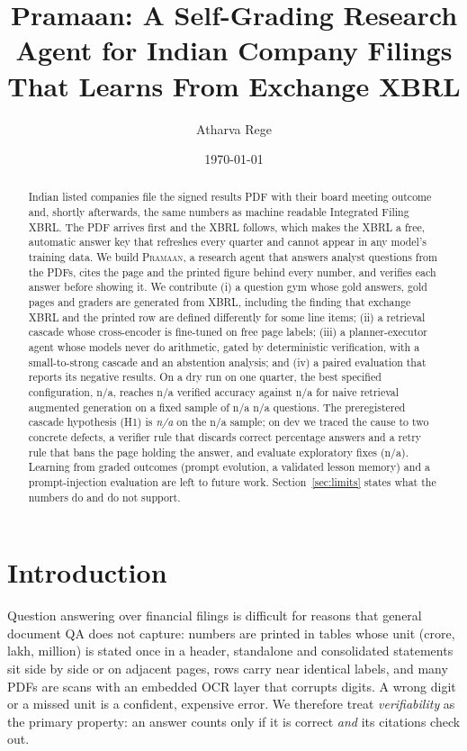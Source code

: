 \documentclass[11pt]{article}
\title{Pramaan: A Self-Grading Research Agent for Indian Company Filings\\That Learns From Exchange XBRL}
\author{Atharva Rege}
\date{\today}
\providecommand{\PramaanVerified}{n/a}
\providecommand{\BzeroVerified}{n/a}
\providecommand{\PramaanConfig}{n/a}
\providecommand{\NSample}{n/a}
\providecommand{\EvalSplit}{n/a}
\providecommand{\HOneVerdict}{n/a}
\providecommand{\VariantNote}{n/a}
\begin{document}
\maketitle

\begin{abstract}
Indian listed companies file the signed results PDF with their board meeting outcome and, shortly afterwards, the same numbers as machine readable Integrated Filing XBRL. The PDF arrives first and the XBRL follows, which makes the XBRL a free, automatic answer key that refreshes every quarter and cannot appear in any model's training data. We build \textsc{Pramaan}, a research agent that answers analyst questions from the PDFs, cites the page and the printed figure behind every number, and verifies each answer before showing it. We contribute (i) a question gym whose gold answers, gold pages and graders are generated from XBRL, including the finding that exchange XBRL and the printed row are defined differently for some line items; (ii) a retrieval cascade whose cross-encoder is fine-tuned on free page labels; (iii) a planner-executor agent whose models never do arithmetic, gated by deterministic verification, with a small-to-strong cascade and an abstention analysis; and (iv) a paired evaluation that reports its negative results. On a dry run on one quarter, the best specified configuration, \PramaanConfig, reaches \PramaanVerified{} verified accuracy against \BzeroVerified{} for naive retrieval augmented generation on a fixed sample of \NSample{} \EvalSplit{} questions. The preregistered cascade hypothesis (H1) is \emph{\HOneVerdict{}} on the \EvalSplit{} sample; on dev we traced the cause to two concrete defects, a verifier rule that discards correct percentage answers and a retry rule that bans the page holding the answer, and evaluate exploratory fixes (\VariantNote{}). Learning from graded outcomes (prompt evolution, a validated lesson memory) and a prompt-injection evaluation are left to future work. Section~\ref{sec:limits} states what the numbers do and do not support.
\end{abstract}

\section{Introduction}
Question answering over financial filings is difficult for reasons that general document QA does not capture: numbers are printed in tables whose unit (crore, lakh, million) is stated once in a header, standalone and consolidated statements sit side by side or on adjacent pages, rows carry near identical labels, and many PDFs are scans with an embedded OCR layer that corrupts digits. A wrong digit or a missed unit is a confident, expensive error. We therefore treat \emph{verifiability} as the primary property: an answer counts only if it is correct \emph{and} its citations check out.
\end{document}
